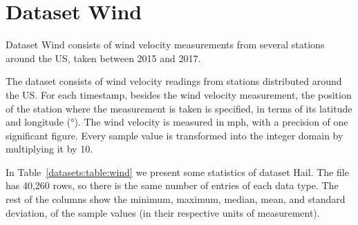 
\vspace{-15pt}
\section{Dataset Wind}
\label{datasets:wind}

Dataset Wind \cite{dataset:spc} consists of wind velocity measurements from several stations around the US, taken between 2015 and 2017. \SPCDef


The dataset consists of wind velocity readings from stations distributed around the US. For each timestamp, besides the wind velocity measurement, the position of the station where the measurement is taken is specified, in terms of its latitude and longitude (°). The wind velocity is measured in mph, with a precision of one significant figure. Every sample value is transformed into the integer domain by multiplying it by 10.


In Table~\ref{datasets:table:wind} we present some statistics of dataset Hail. \SPCTable The file has 40,260 rows, so there is the same number of entries of each data type. The rest of the columns show the minimum, maximum, median, mean, and standard deviation, of the sample values (in their respective units of measurement).


